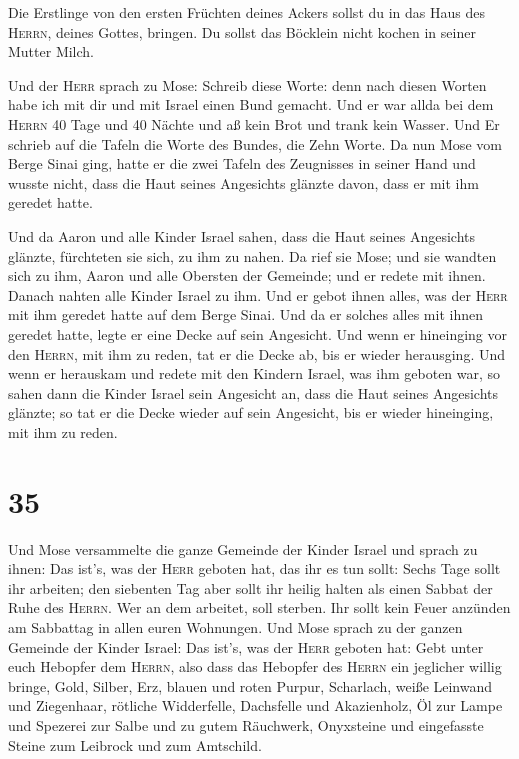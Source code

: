  Die Erstlinge von den ersten Früchten deines Ackers
sollst du in das Haus des \textsc{Herrn}, deines Gottes, bringen. Du
sollst das Böcklein nicht kochen in seiner Mutter Milch.

 Und der \textsc{Herr} sprach zu Mose: Schreib diese
Worte: denn nach diesen Worten habe ich mit dir und mit Israel einen
Bund gemacht.  Und er war allda bei dem \textsc{Herrn} 40
Tage und 40 Nächte und aß kein Brot und trank kein Wasser. Und Er
schrieb auf die Tafeln die Worte des Bundes, die Zehn Worte.
 Da nun Mose vom Berge Sinai ging, hatte er die zwei
Tafeln des Zeugnisses in seiner Hand und wusste nicht, dass die Haut
seines Angesichts glänzte davon, dass er mit ihm geredet hatte.

 Und da Aaron und alle Kinder Israel sahen, dass die Haut
seines Angesichts glänzte, fürchteten sie sich, zu ihm zu nahen.
 Da rief sie Mose; und sie wandten sich zu ihm, Aaron und
alle Obersten der Gemeinde; und er redete mit ihnen. 
Danach nahten alle Kinder Israel zu ihm. Und er gebot ihnen alles, was
der \textsc{Herr} mit ihm geredet hatte auf dem Berge Sinai.
 Und da er solches alles mit ihnen geredet hatte, legte
er eine Decke auf sein Angesicht.  Und wenn er hineinging
vor den \textsc{Herrn}, mit ihm zu reden, tat er die Decke ab, bis er
wieder herausging. Und wenn er herauskam und redete mit den Kindern
Israel, was ihm geboten war,  so sahen dann die Kinder
Israel sein Angesicht an, dass die Haut seines Angesichts glänzte; so
tat er die Decke wieder auf sein Angesicht, bis er wieder hineinging,
mit ihm zu reden.

\hypertarget{section-34}{%
\section{35}\label{section-34}}

 Und Mose versammelte die ganze Gemeinde der Kinder Israel
und sprach zu ihnen: Das ist's, was der \textsc{Herr} geboten hat, das
ihr es tun sollt:  Sechs Tage sollt ihr arbeiten; den
siebenten Tag aber sollt ihr heilig halten als einen Sabbat der Ruhe des
\textsc{Herrn}. Wer an dem arbeitet, soll sterben.  Ihr
sollt kein Feuer anzünden am Sabbattag in allen euren Wohnungen.
 Und Mose sprach zu der ganzen Gemeinde der Kinder Israel:
Das ist's, was der \textsc{Herr} geboten hat:  Gebt unter
euch Hebopfer dem \textsc{Herrn}, also dass das Hebopfer des
\textsc{Herrn} ein jeglicher willig bringe, Gold, Silber, Erz,
 blauen und roten Purpur, Scharlach, weiße Leinwand und
Ziegenhaar,  rötliche Widderfelle, Dachsfelle und
Akazienholz,  Öl zur Lampe und Spezerei zur Salbe und zu
gutem Räuchwerk,  Onyxsteine und eingefasste Steine zum
Leibrock und zum Amtschild.

